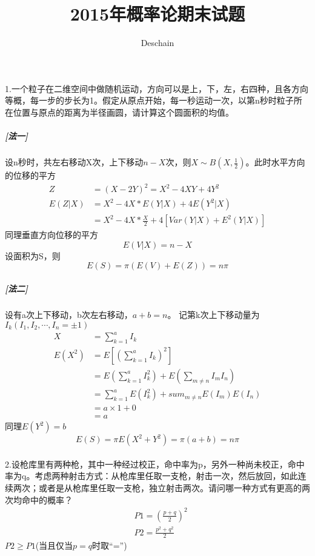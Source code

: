 \documentclass[UTF8]{ctexart}
\title{2015年概率论期末试题}
\author{Deschain}
\begin{document}
\maketitle
\paragraph{}
1.一个粒子在二维空间中做随机运动，方向可以是上，下，左，右四种，且各方向等概，每一步的步长为1。假定从原点开始，每一秒运动一次，以第n秒时粒子所在位置与原点的距离为半径画圆，请计算这个圆面积的均值。
\subparagraph{[法一]}
设n秒时，共左右移动X次，上下移动$n-X$次，则$X\sim B(X,\frac{1}{2})$。此时水平方向的位移的平方
\begin{equation*}
\begin{aligned}
Z&=(X-2Y)^2=X^2-4XY+4Y^2 \\
E(Z\lvert X)&= X^2-4X*E(Y\lvert X)+4E(Y^2\lvert X) \\
&= X^2-4X*\frac{X}{2}+4[Var(Y\lvert X)+E^2(Y \lvert X)]
\end{aligned}
\end{equation*}
同理垂直方向位移的平方
\[ E(V\lvert X)=n-X\]
设面积为S，则
\[E(S)=\pi (E(V)+E(Z))=n\pi \]
\subparagraph{[法二]}
设有a次上下移动，b次左右移动，$a+b=n$。
记第k次上下移动量为$I_k(I_1,I_2,\cdots ,I_n =\pm 1)$
\begin{equation*}
\begin{aligned}
X&=\sum_{k=1}^a I_k \\
E(X^2)&=E[(\sum_{k=1}^a I_k)^2] \\
&=E(\sum_{k=1}^a I_k^2)+E(\sum_{m\neq n}^{}I_m I_n) \\
&=\sum_{k=1}^a E(I_k^2) + sum_{m\neq n}^{}E(I_m)E(I_n) \\
&=a\times 1+0 \\
&=a
\end{aligned}
\end{equation*}
同理$E(Y^2)=b$
\[ E(S)=\pi E(X^2+Y^2)=\pi (a+b)=n\pi \]
\paragraph{}
2.设枪库里有两种枪，其中一种经过校正，命中率为p，另外一种尚未校正，命中率为q。考虑两种射击方式：从枪库里任取一支枪，射击一次，然后放回，如此连续两次；或者是从枪库里任取一支枪，独立射击两次。请问哪一种方式有更高的两次均命中的概率？
\begin{equation*}
\begin{aligned}
&P1=(\frac{p+q}{2})^2 \\
&P2=\frac{p^2+q^2}{2}
\end{aligned}
\end{equation*}
$P2\geq P1$(当且仅当$p=q$时取“=”)
\end{document}
